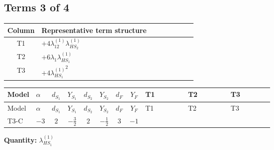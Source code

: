 \documentclass[8pt]{article}
\begin{document}
\begin{landscape}
\subsection*{Terms 3 of 4}
\begin{center}
\begin{tabular}{@{}c >{\raggedright\arraybackslash}p{0.82\linewidth}@{}}
\toprule
Column & Representative term structure \\
\midrule
T1 & \(\displaystyle +4 {\lambda_{12}^{(1)}} {\lambda_{HS_2}^{(1)}}\) \\
\midrule
T2 & \(\displaystyle +6 {\lambda_1} {\lambda_{HS_1}^{(1)}}\) \\
\midrule
T3 & \(\displaystyle +4 {\lambda_{HS_1}^{(1)}}^2\) \\
\midrule
\bottomrule
\end{tabular}
\end{center}
\smallskip
\tiny
\begin{longtable}{@{}llcccccc >{\raggedright\arraybackslash}p{0.21\linewidth} >{\raggedright\arraybackslash}p{0.21\linewidth} >{\raggedright\arraybackslash}p{0.21\linewidth}@{}}
\toprule
Model & $\alpha$ & $d_{S_1}$ & $Y_{S_1}$ & $d_{S_2}$ & $Y_{S_2}$ & $d_F$ & $Y_F$ & T1 & T2 & T3 \\
\midrule
\endfirsthead
\toprule
Model & $\alpha$ & $d_{S_1}$ & $Y_{S_1}$ & $d_{S_2}$ & $Y_{S_2}$ & $d_F$ & $Y_F$ & T1 & T2 & T3 \\
\midrule
\endhead
T3-C & $-3$ & $2$ & $-\frac{3}{2}$ & $2$ & $-\frac{1}{2}$ & $3$ & $-1$ & \scriptsize\adjustbox{max width=\linewidth}{$\begin{gathered} +4 {\lambda_{12}^{(1)}} {\lambda_{HS_2}^{(1)}}\end{gathered}$} & \scriptsize\adjustbox{max width=\linewidth}{$\begin{gathered} +6 {\lambda_1} {\lambda_{HS_1}^{(1)}}\end{gathered}$} & \scriptsize\adjustbox{max width=\linewidth}{$\begin{gathered} +4 {\lambda_{HS_1}^{(1)}}^2\end{gathered}$} \\
\midrule
\bottomrule
\end{longtable}
\clearpage
\noindent\textbf{Quantity: }$\lambda_{HS_1}^{(1)}$\par\smallskip

\end{landscape}
\end{document}

